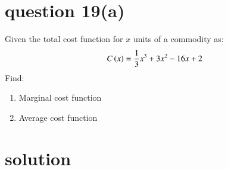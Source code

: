 \documentclass[journal,12pt,twocolumn]{IEEEtran}
\begin{document}
 \section*{question 19(a)} 
   Given the total cost function for $x$ units of a commodity as:
   \begin{align*}
      C\left(x\right) = \frac{1}{3}x^3 + 3x^2 - 16x +2
   \end{align*}
   Find:
   \begin{enumerate}[ label=(\roman*)]
    \item Marginal cost function
    \item Average cost function
   \end{enumerate}
   
  \section*{solution}
\end{document}
